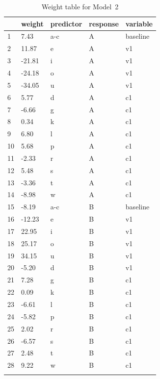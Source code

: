 \begin{table}%
  \centering
  \begin{tabular}{lllll}
    \lsptoprule
       & weight & predictor & response & variable \\
    \midrule
    1  & 7.43   & a-c       & A        & baseline \\
    2  & 11.87  & e         & A        & v1       \\
    3  & -21.81 & i         & A        & v1       \\
    4  & -24.18 & o         & A        & v1       \\
    5  & -34.05 & u         & A        & v1       \\
    6  & 5.77   & d         & A        & c1       \\
    7  & -6.66  & g         & A        & c1       \\
    8  & 0.34   & k         & A        & c1       \\
    9  & 6.80   & l         & A        & c1       \\
    10 & 5.68   & p         & A        & c1       \\
    11 & -2.33  & r         & A        & c1       \\
    12 & 5.48   & s         & A        & c1       \\
    13 & -3.36  & t         & A        & c1       \\
    14 & -8.98  & w         & A        & c1       \\
    15 & -8.19  & a-c       & B        & baseline \\
    16 & -12.23 & e         & B        & v1       \\
    17 & 22.95  & i         & B        & v1       \\
    18 & 25.17  & o         & B        & v1       \\
    19 & 34.15  & u         & B        & v1       \\
    20 & -5.20  & d         & B        & v1       \\
    21 & 7.28   & g         & B        & c1       \\
    22 & 0.09   & k         & B        & c1       \\
    23 & -6.61  & l         & B        & c1       \\
    24 & -5.82  & p         & B        & c1       \\
    25 & 2.02   & r         & B        & c1       \\
    26 & -6.57  & s         & B        & c1       \\
    27 & 2.48   & t         & B        & c1       \\
    28 & 9.22   & w         & B        & c1       \\
    \lspbottomrule
  \end{tabular}\caption{Weight table for Model~2}\label{tab:model2-weights}
\end{table}

